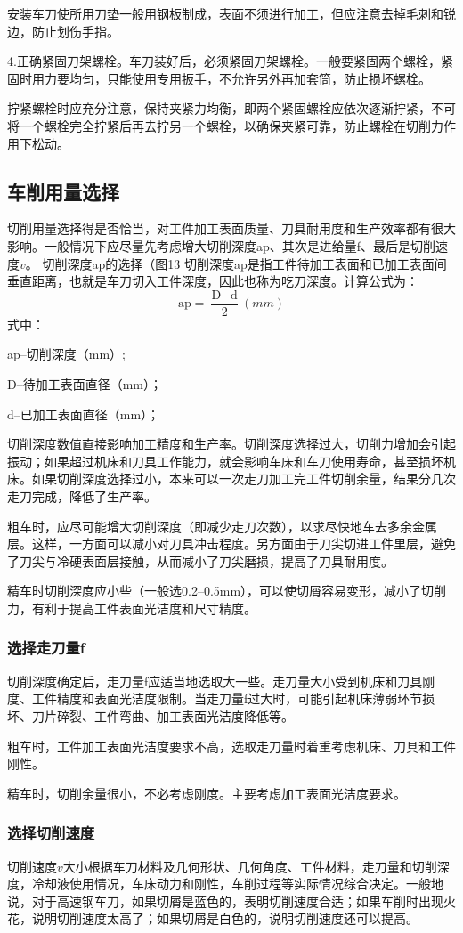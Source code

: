 \documentclass{ctexbook}
\begin{document}
安装车刀使所用刀垫一般用钢板制成，表面不须进行加工，但应注意去掉毛刺和锐边，防止划伤手指。

4.正确紧固刀架螺栓。车刀装好后，必须紧固刀架螺栓。一般要紧固两个螺栓，紧固时用力要均匀，只能使用专用扳手，不允许另外再加套筒，防止损坏螺栓。

拧紧螺栓时应充分注意，保持夹紧力均衡，即两个紧固螺栓应依次逐渐拧紧，不可将一个螺栓完全拧紧后再去拧另一个螺栓，以确保夹紧可靠，防止螺栓在切削力作用下松动。
\subsection{车削用量选择}
切削用量选择得是否恰当，对工件加工表面质量、刀具耐用度和生产效率都有很大影响。一般情况下应尽量先考虑增大切削深度ap、其次是进给量f、最后是切削速度$v$。
切削深度ap的选择（图13
切削深度ap是指工件待加工表面和已加工表面间垂直距离，也就是车刀切入工件深度，因此也称为吃刀深度。计算公式为：
\begin{equation*}
	\text{ap}=\frac{\text{D}-\text{d}}{2} (mm)
\end{equation*}
式中：

ap--切削深度（mm）;

D--待加工表面直径（mm）；

d--已加工表面直径（mm）；

切削深度数值直接影响加工精度和生产率。切削深度选择过大，切削力增加会引起振动；如果超过机床和刀具工作能力，就会影响车床和车刀使用寿命，甚至损坏机床。如果切削深度选择过小，本来可以一次走刀加工完工件切削余量，结果分几次走刀完成，降低了生产率。

粗车时，应尽可能增大切削深度（即减少走刀次数），以求尽快地车去多余金属层。这样，一方面可以减小对刀具冲击程度。另方面由于刀尖切进工件里层，避免了刀尖与冷硬表面层接触，从而减小了刀尖磨损，提高了刀具耐用度。

精车时切削深度应小些（一般选0.2--0.5mm），可以使切屑容易变形，减小了切削力，有利于提高工件表面光洁度和尺寸精度。
\subsubsection{选择走刀量f}
切削深度确定后，走刀量f应适当地选取大一些。走刀量大小受到机床和刀具刚度、工件精度和表面光洁度限制。当走刀量f过大时，可能引起机床薄弱环节损坏、刀片碎裂、工件弯曲、加工表面光洁度降低等。

粗车时，工件加工表面光洁度要求不高，选取走刀量时着重考虑机床、刀具和工件刚性。

精车时，切削余量很小，不必考虑刚度。主要考虑加工表面光洁度要求。
\subsubsection{选择切削速度}
切削速度$v$大小根据车刀材料及几何形状、几何角度、工件材料，走刀量和切削深度，冷却液使用情况，车床动力和刚性，车削过程等实际情况综合决定。一般地说，对于高速钢车刀，如果切屑是蓝色的，表明切削速度合适；如果车削时出现火花，说明切削速度太高了；如果切屑是白色的，说明切削速度还可以提高。
\end{document}
